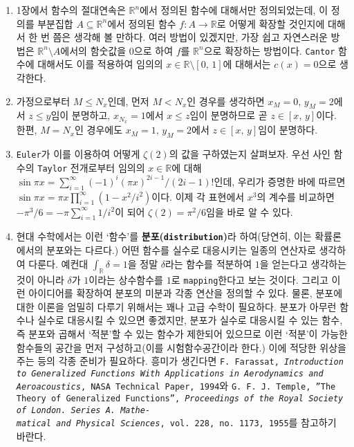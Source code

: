 \begin{enumerate}[label = \textsf{\textbf{\arabic*}}]
    \item 1장에서 함수의 절대연속은 $\mathbb{R}^n$에서 정의된 함수에 대해서만 정의되었는데, 이 정의를 부분집합 $A\subseteq\mathbb{R}^n$에서 정의된 함수 $f:A\to\mathbb{R}$로 어떻게 확장할 것인지에 대해서 한 번 쯤은 생각해 볼 만하다. 여러 방법이 있겠지만, 가장 쉽고 자연스러운 방법은 $\mathbb{R}^n\setminus A$에서의 함숫값을 $0$으로 하여 $f$를 $\mathbb{R}^n$으로 확장하는 방법이다. \texttt{Cantor} 함수에 대해서도 이를 적용하여 임의의 $x\in\mathbb{R}\setminus[0,\,1]$에 대해서는 $c(x)=0$으로 생각한다.
    \item 가정으로부터 $M\leq N_x$인데, 먼저 $M<N_x$인 경우를 생각하면 $x_M=0,\,y_M=2$에서 $z\leq y$임이 분명하고, $x_{N_x}=1$에서 $x\leq z$임이 분명하므로 곧 $z\in[x,\,y]$이다. 한편, $M=N_x$인 경우에도 $x_M=1,\,y_M=2$에서 $z\in[x,\,y]$임이 분명하다.
    \item \texttt{Euler}가 이를 이용하여 어떻게 $\zeta(2)$의 값을 구하였는지 살펴보자. 우선 사인 함수의 \texttt{Taylor} 전개로부터 임의의 $x\in\mathbb{R}$에 대해 $\sin\pi x=\sum_{i=1}^\infty(-1)^i(\pi x)^{2i-1}/(2i-1)!$인데, 우리가 증명한 바에 따르면 $\sin\pi x=\pi x\prod_{i=1}^\infty(1-x^2/i^2)$이다. 이제 각 표현에서 $x^3$의 계수를 비교하면 $-\pi^3/6=-\pi\sum_{i=1}^\infty1/i^2$이 되어 $\zeta(2)=\pi^2/6$임을 바로 알 수 있다.
    \item 현대 수학에서는 이런 `함수'를 \textbf{분포(\texttt{distribution})}라 하여(당연히, 이는 확률론에서의 분포와는 다르다.) 어떤 함수를 실수로 대응시키는 일종의 연산자로 생각하여 다룬다. 예컨대 $\int_{\mathbb{R}}\delta=1$을 정말 $\delta$라는 함수를 적분하여 $1$을 얻는다고 생각하는 것이 아니라 $\delta$가 $1$이라는 상수함수를 $1$로 \texttt{mapping}한다고 보는 것이다. 그리고 이런 아이디어를 확장하여 분포의 미분과 각종 연산을 정의할 수 있다. 물론, 분포에 대한 이론을 엄밀히 다루기 위해서는 꽤나 고급 수학이 필요하다. 분포가 아무런 함수나 실수로 대응시킬 수 있으면 좋겠지만, 분포가 실수로 대응시킬 수 있는 함수, 즉 분포와 곱해서 `적분'할 수 있는 함수가 제한되어 있으므로 이런 `적분'이 가능한 함수들의 공간을 먼저 구성하고(이를 시험함수공간이라 한다.) 이에 적당한 위상을 주는 등의 각종 준비가 필요하다. 흥미가 생긴다면 \texttt{F. Farassat, \textit{Introduction to Generalized Functions With Applications in Aerodynamics and Aeroacoustics}, NASA Technical Paper, 1994}와 \texttt{G. F. J. Temple, ''The Theory of Generalized Functions'', \textit{Proceedings of the Royal Society of London. Series A. Mathe-\\matical and Physical Sciences}, vol. 228, no. 1173, 1955}를 참고하기 바란다.
\end{enumerate}

